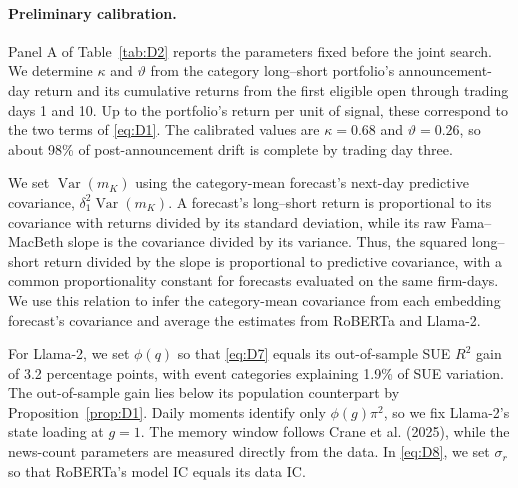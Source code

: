 \documentclass[11pt,letterpaper]{article}
\theoremstyle{remark}
\DeclareMathOperator{\Var}{Var}
\begin{document}
\paragraph{Preliminary calibration.}
Panel A of Table~\ref{tab:D2} reports the parameters fixed before the joint search. We determine $\kappa$ and $\vartheta$ from the category long--short portfolio's announcement-day return and its cumulative returns from the first eligible open through trading days 1 and 10. Up to the portfolio's return per unit of signal, these correspond to the two terms of \eqref{eq:D1}. The calibrated values are $\kappa=0.68$ and $\vartheta=0.26$, so about 98\% of post-announcement drift is complete by trading day three.

We set $\Var(m_K)$ using the category-mean forecast's next-day predictive covariance, $\delta_1^2\Var(m_K)$. A forecast's long--short return is proportional to its covariance with returns divided by its standard deviation, while its raw Fama--MacBeth slope is the covariance divided by its variance. Thus, the squared long--short return divided by the slope is proportional to predictive covariance, with a common proportionality constant for forecasts evaluated on the same firm-days. We use this relation to infer the category-mean covariance from each embedding forecast's covariance and average the estimates from RoBERTa and Llama-2.

For Llama-2, we set $\phi(q)$ so that \eqref{eq:D7} equals its out-of-sample SUE $R^2$ gain of 3.2 percentage points, with event categories explaining 1.9\% of SUE variation. The out-of-sample gain lies below its population counterpart by Proposition~\ref{prop:D1}. Daily moments identify only $\phi(g)\pi^2$, so we fix Llama-2's state loading at $g=1$. The memory window follows Crane et al. (2025), while the news-count parameters are measured directly from the data. In \eqref{eq:D8}, we set $\sigma_r$ so that RoBERTa's model IC equals its data IC.
\end{document}
